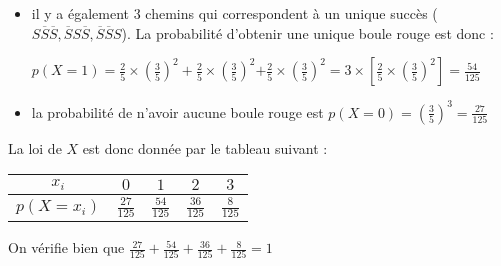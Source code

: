 {\begin{itemize}
          \par
          $p\left(X=2\right) =\left(\frac{2}{5}\right)^{2}\times \frac{3}{5}+\left(\frac{2}{5}\right)^{2}\times \frac{3}{5}$\nosp$+\left(\frac{2}{5}\right)^{2}\times \frac{3}{5}$\nosp$=3\times \left[\left(\frac{2}{5}\right)^{2}\times \frac{3}{5}\right]=\frac{36}{125}$
          \item il y a également 3 chemins qui correspondent à un unique succès ($S\overline S\overline S, \overline SS\overline S, \overline S\overline SS$). La probabilité d'obtenir une unique boule rouge est donc :
          \par
          $p\left(X=1\right) = \frac{2}{5}\times \left(\frac{3}{5}\right)^{2}+ \frac{2}{5}\times \left(\frac{3}{5}\right)^{2}$\nosp$+ \frac{2}{5}\times \left(\frac{3}{5}\right)^{2}$\nosp$=3\times \left[ \frac{2}{5}\times \left(\frac{3}{5}\right)^{2}\right]=\frac{54}{125}$
          \item la probabilité de n'avoir aucune boule rouge est  $p\left(X=0\right) =\left(\frac{3}{5}\right)^{3}=\frac{27}{125}$
     \end{itemize}
     La loi de $X$ est donc donnée par le tableau suivant :
     \begin{center}
          \begin{tabular}{|c|c|c|c|c|}%
               \hline
               \textbf{$x_{i}$}  & $0$  & $1$ & $2$ & $3$
               \\ \hline
               \textbf{$p\left(X=x_{i}\right)$}    &  $\frac{27}{125}$  &   $\frac{54}{125}$ &   $\frac{36}{125}$ &   $\frac{8}{125}$
               \\ \hline
          \end{tabular}
     \end{center}
     On vérifie bien que $\frac{27}{125}+\frac{54}{125}+\frac{36}{125}+\frac{8}{125}=1$
}
